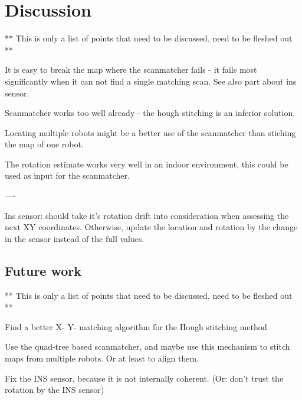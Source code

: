 
\chapter{Discussion}
\label{discussion}

** This is only a list of points that need to be discussed, need to be fleshed out **

It is easy to break the map where the scanmatcher fails - it fails most significantly when it can not find a single matching scan. See also part about ins sensor.

Scanmatcher works too well already - the hough stitching is an inferior solution.

Locating multiple robots might be a better use of the scanmatcher than stiching the map of one robot.

The rotation estimate works very well in an indoor environment, this could be used as input for the scanmatcher.

----

Ins sensor: should take it's rotation drift into consideration when assessing the next XY coordinates. Otherwise, update the location and rotation by the change in the sensor instead of the full values.

\section{Future work}
\label{futurework}

** This is only a list of points that need to be discussed, need to be fleshed out **

Find a better X- Y- matching algorithm for the Hough stitching method

Use the quad-tree based scanmatcher, and maybe use this mechanism to stitch maps from multiple robots. Or at least to align them.

Fix the INS sensor, because it is not internally coherent. (Or: don't trust the rotation by the INS sensor)

